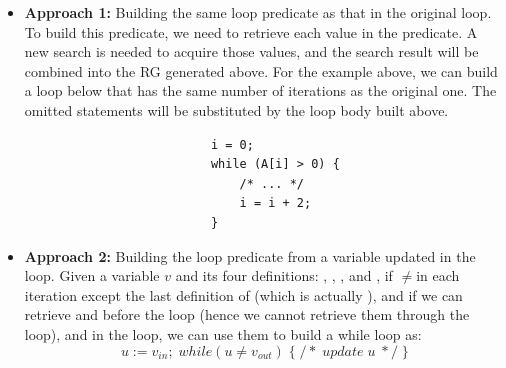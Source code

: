 
\begin{itemize}
\setlength{\itemsep}{5pt}%

\item \textbf{Approach 1:} Building the same loop predicate as that in the original loop. 
To build this predicate, we need to retrieve each value in the predicate.
A new search is needed to acquire those values, and the search result will be combined into the RG generated above.
For the example above, we can build a loop below that has the same number of iterations as the original one. The omitted statements will be substituted by the loop body built above.



\small
\begin{verbatim}
                          i = 0;
                          while (A[i] > 0) {
                              /* ... */
                              i = i + 2;
                          }
\end{verbatim}
\normalsize




\item \textbf{Approach 2:} Building the loop predicate from a variable updated in the loop. Given a variable $v$ and its four definitions: \vinit, \vmu, \viter, and \vfinal, if \vmu$\ne$\vfinal in each iteration except the last definition of \vmu (which is actually \vfinal), and if we can retrieve \vinit and \vfinal before the loop (hence we cannot retrieve them through the loop), and \viter in the loop, we can use them to build a while loop as:
$$
u := v_{in}; \; while (u \ne v_{out}) \;  \{\; /* \; update \; u \; */ \; \}
$$


\end{itemize}

